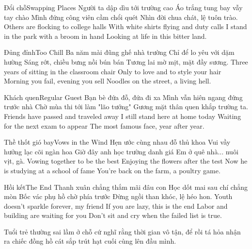 \begin{tutuyetbox}{Đổi chỗ}{Swapping Places}
Người ta dập dìu tới trường cao
Áo trắng tung bay vẫy tay chào
Mình đứng công viên cầm chổi quét
Nhìn đời chua chát, lệ tuôn trào.
\tcblower
Others are flocking to college halls
With white shirts flying and duty calls
I stand in the park with a broom in hand
Looking at life in this bitter land.
\end{tutuyetbox}

\begin{tutuyetbox}{Đủng đỉnh}{Too Chill}
Ba năm mài đũng ghế nhà trường
Chỉ để lo yêu với dặm hường
Sáng rớt, chiều bưng nồi bún bán
Tương lai mờ mịt, mặt đầy sương.
\tcblower
Three years of sitting in the classroom chair
Only to love and to style your hair
Morning you fail, evening you sell
Noodles on the street, a living hell.
\end{tutuyetbox}

\begin{tutuyetbox}{Khách quen}{Regular Guest}
Bạn bè đứa đỗ, đứa đi xa
Mình vẫn hiên ngang đứng trước nhà
Chờ mùa thi tới làm "lão tướng"
Gương mặt thân quen khắp trường ta.
\tcblower
Friends have passed and traveled away
I still stand here at home today
Waiting for the next exam to appear
The most famous face, year after year.
\end{tutuyetbox}

\begin{tutuyetbox}{Thề thốt gió bay}{Vows in the Wind}
Hẹn ước cùng nhau đỗ thủ khoa
Vui vầy hưởng lạc cõi ngàn hoa
Giờ đây anh học trường danh giá
Em ở quê nhà... nuôi vịt, gà.
\tcblower
Vowing together to be the best
Enjoying the flowers after the test
Now he is studying at a school of fame
You're back on the farm, a poultry game.
\end{tutuyetbox}

\begin{tutuyetbox}{Hồi kết}{The End}
Thanh xuân chẳng thắm mãi đâu con
Học dốt mai sau chí chẳng mòn
Bốc vác phụ hồ chờ phía trước
Đừng ngồi than khóc, lệ héo hon.
\tcblower
Youth doesn't sparkle forever, my friend
If you are lazy, this is the end
Labor and building are waiting for you
Don't sit and cry when the failed list is true.
\end{tutuyetbox}

\begin{ghichu}
Tuổi trẻ thường sai lầm ở chỗ cứ nghĩ rằng thời gian vô tận, để rồi tá hỏa nhận ra chiếc đồng hồ cát sắp trút hạt cuối cùng lên đầu mình.
\end{ghichu}